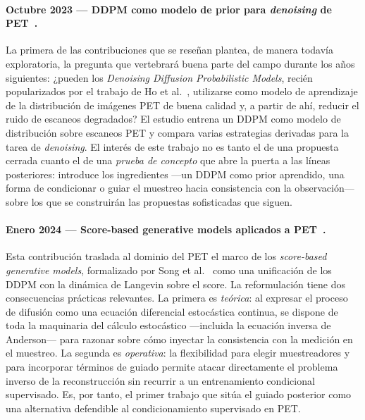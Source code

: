 \paragraph{Octubre 2023 — DDPM como modelo de prior para
\textit{denoising} de PET~\cite{ddpmpet2023}.} La primera de las
contribuciones que se reseñan plantea, de manera todavía
exploratoria, la pregunta que vertebrará buena parte del campo
durante los años siguientes: ¿pueden los \emph{Denoising Diffusion
Probabilistic Models}, recién popularizados por el trabajo de Ho
et al.~\cite{ho2020ddpm}, utilizarse como modelo de aprendizaje
de la distribución de imágenes PET de buena calidad y, a partir
de ahí, reducir el ruido de escaneos degradados? El estudio
entrena un DDPM como modelo de distribución sobre escaneos PET y
compara varias estrategias derivadas para la tarea de
\textit{denoising}. El interés de este trabajo no es tanto el de
una propuesta cerrada cuanto el de una \emph{prueba de concepto}
que abre la puerta a las líneas posteriores: introduce los
ingredientes —un DDPM como prior aprendido, una forma de
condicionar o guiar el muestreo hacia consistencia con la
observación— sobre los que se construirán las propuestas
sofisticadas que siguen.

\paragraph{Enero 2024 — Score-based generative models aplicados a
PET~\cite{scorepet2024}.} Esta contribución traslada al dominio
del PET el marco de los \emph{score-based generative models},
formalizado por Song et al.~\cite{song2021sde} como una
unificación de los DDPM con la dinámica de Langevin sobre el
score. La reformulación tiene dos consecuencias prácticas
relevantes. La primera es \emph{teórica}: al expresar el proceso
de difusión como una ecuación diferencial estocástica continua,
se dispone de toda la maquinaria del cálculo estocástico —incluida
la ecuación inversa de Anderson— para razonar sobre cómo inyectar
la consistencia con la medición en el muestreo. La segunda es
\emph{operativa}: la flexibilidad para elegir muestreadores y para
incorporar términos de guiado permite atacar directamente el
problema inverso de la reconstrucción sin recurrir a un
entrenamiento condicional supervisado. Es, por tanto, el primer
trabajo que sitúa el guiado posterior como una alternativa
defendible al condicionamiento supervisado en PET.

